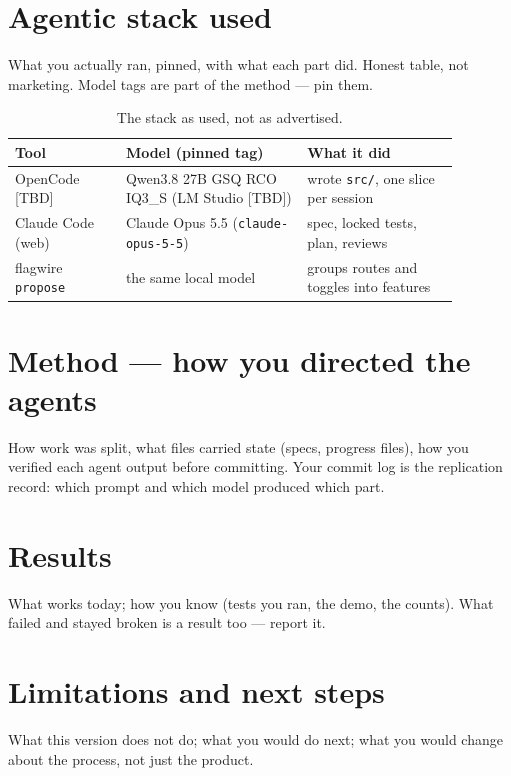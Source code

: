 \documentclass[a4paper]{article}
\begin{document}
\section{Agentic stack used}
What you actually ran, pinned, with what each part did. Honest table, not
marketing. Model tags are part of the method --- pin them.

\begin{table}[h]
\centering\small
\begin{center}
\begin{tabular}{ | >{\raggedright\arraybackslash}p{0.22\linewidth} | >{\raggedright\arraybackslash}p{0.36\linewidth} | >{\raggedright\arraybackslash}p{0.30\linewidth} | }
\hline 
  \textbf{Tool} & \textbf{Model (pinned tag)} & \textbf{What it did}\\
\hline
  OpenCode [TBD] & Qwen3.8 27B GSQ RCO IQ3\_S (LM Studio [TBD]) & wrote \texttt{src/}, one slice per session \\
  Claude Code (web) & Claude Opus 5.5 (\texttt{claude-opus-5-5}) & spec, locked tests, plan, reviews \\
  flagwire \texttt{propose} & the same local model & groups routes and toggles into features \\
\hline
\end{tabular}
\end{center}
\caption{The stack as used, not as advertised.}
\end{table}

\section{Method --- how you directed the agents}
How work was split, what files carried state (specs, progress files), how you
verified each agent output before committing. Your commit log is the
replication record: which prompt and which model produced which part.

\section{Results}
What works today; how you know (tests you ran, the demo, the counts). What
failed and stayed broken is a result too --- report it.

\section{Limitations and next steps}
What this version does not do; what you would do next; what you would change
about the process, not just the product.
\end{document}
